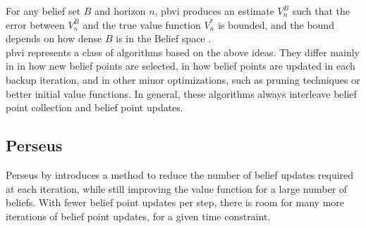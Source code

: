 For any belief set $B$ and horizon $n$, \gls{pbvi} produces an estimate \(V_{n}^{B}\) such that the 
error between \(V_{n}^{B}\) and the true value function \(V^*_{n}\) is bounded, and the bound 
depends on how dense $B$ is in the Belief space \cite{10.5555/1630659.1630806}. \\

\gls{pbvi} represents a class of algorithms based on the above ideas. They differ mainly in 
in how new belief points are selected, in how belief points are updated in each
backup iteration, and in other minor optimizations, such as pruning techniques
or better initial value functions. 
In general, these algorithms always interleave belief point collection and belief point updates.

\subsection{Perseus}
Perseus by \cite{Spaan_2005} introduces a method to reduce the number of belief updates required at each iteration,
while still improving the value function for a large number of beliefs. With fewer belief point 
updates per step, there is room for many more iterations of belief point updates, for a given 
time constraint. 


    

